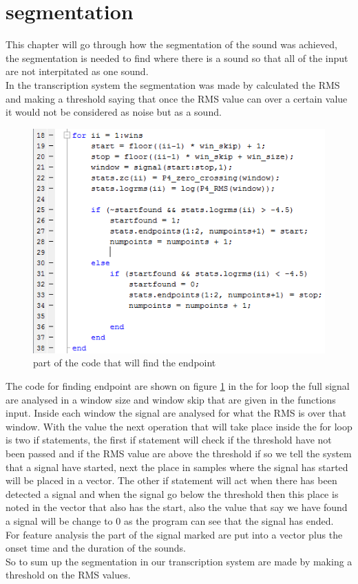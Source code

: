 \section{segmentation}
This chapter will go through how the segmentation of the sound was achieved, the segmentation is needed to find where there is a sound so that all of the input are not interpitated as one sound.\\
In the transcription system the segmentation was made by calculated the RMS and making a threshold saying that once the RMS value can over a certain value it would not be considered as noise but as a sound. \\
\begin{figure}[h]
	\begin{center}
		\includegraphics[scale =  0.8]{fig/Find_Endpoint_script.png}
		\caption{part of the code that will find the endpoint}
		\label{P4_Findendpoints}
	\end{center}
\end{figure}
The code for finding endpoint are shown on figure \ref{P4_Findendpoints} in the for loop the full signal are analysed in a window size and window skip that are given in the functions input. Inside each window the signal are analysed for what the RMS is over that window. With the value the next operation that will take place inside the for loop is two if statements, the first if statement will check if the threshold have not been passed and if the RMS value are above the threshold if so we tell the system that a signal have started, next the place in samples where the signal has started will be placed in a vector. The other if statement will act when there has been detected a signal and when the signal go below the threshold then this place is noted in the vector that also has the start, also the value that say we have found a signal will be change to 0 as the program can see that the signal has ended.\\
For feature analysis the part of the signal marked are put into a vector plus the onset time and the duration of the sounds.\\
So to sum up the segmentation in our transcription system are made by making a threshold on the RMS values.